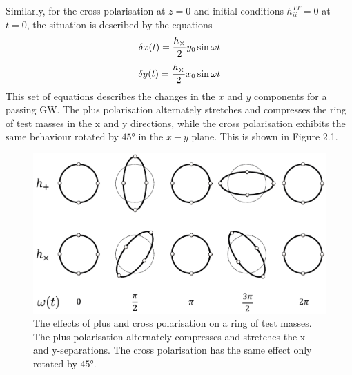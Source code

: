 \documentclass[binding=0.6cm, LaM]{sapthesis}
\begin{document}
        Similarly, for the cross polarisation at $z=0$ and initial conditions $h_{ii}^{TT} = 0$ at $t= 0$, the situation is described by the equations
        \begin{equation}
          \delta x(t) =  {{h_{\times}} \over 2} y_0 \sin \omega t
        \end{equation}
        \begin{equation}
          \delta y(t) =  {{h_{\times}} \over 2} x_0  \sin \omega t
        \end{equation}
        This set of equations describes the changes in the $x$ and $y$ components for a passing GW.
        The plus polarisation alternately stretches and compresses the ring of test masses in the x and y directions,
        while the cross polarisation exhibits the same behaviour rotated by $\ang{45}$ in the $x - y$ plane. This is shown in Figure 2.1.
        \begin{figure}[t]
          \label{ring}
          \includegraphics[scale=1]{ring}
          \centering
          \caption{The effects of plus and cross polarisation on a ring of test masses. The plus polarisation alternately compresses and stretches the x- and y-separations. The cross polarisation has the same effect only rotated by $\ang{45}$.}
          \label{fig:ring}
        \end{figure}
\end{document}
